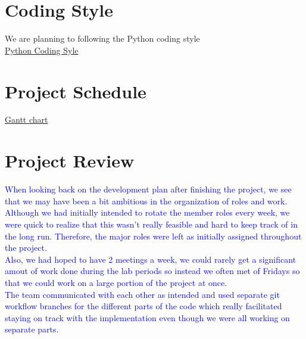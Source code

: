 \documentclass{article}
\begin{document}
\section{Coding Style}
We are planning to following the Python coding style\\
\href{https://google.github.io/styleguide/pyguide.html}{Python Coding Syle}

\section{Project Schedule}
\href{run:../../ProjectSchedule/Gantt-FinalSubmission.pdf}{Gantt chart}

\section{Project Review}
\textcolor{blue}{When looking back on the development plan after finishing the project, we see that we may have been a bit ambitious in the organization of roles and work. Although we had initially intended to rotate the member roles every week, we were quick to realize that this wasn't really feasible and hard to keep track of in the long run. Therefore, the major roles were left as initially assigned throughout the project.} \\

\textcolor{blue}{Also, we had hoped to have 2 meetings a week, we could rarely get a significant amout of work done during the lab periods so instead we often met of Fridays so that we could work on a large portion of the project at once.} \\

\textcolor{blue}{The team communicated with each other as intended and used separate git workflow branches for the different parts of the code which really facilitated staying on track with the implementation even though we were all working on separate parts.}
\end{document}
